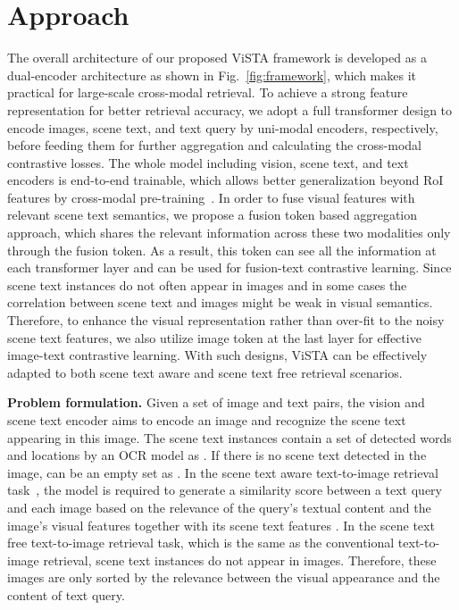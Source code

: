 \documentclass[10pt,twocolumn,letterpaper]{article}
\begin{document}
\section{Approach}
The overall architecture of our proposed ViSTA framework is developed as a dual-encoder architecture as shown in Fig.~\ref{fig:framework}, which makes it practical for large-scale cross-modal retrieval. To achieve a strong feature representation for better retrieval accuracy, we adopt a full transformer design to encode images, scene text, and text query by uni-modal encoders, respectively, before feeding them for further aggregation and calculating the cross-modal contrastive losses. The whole model including vision, scene text, and text encoders is end-to-end trainable, which allows better generalization beyond RoI features by cross-modal pre-training~\cite{Pixel-BERT}\cite{SOHO}\cite{ViLT}\cite{xue2021probing}. In order to fuse visual features with relevant scene text semantics, we propose a fusion token based aggregation approach, which shares the relevant information across these two modalities only through the fusion token. As a result, this token can see all the information at each transformer layer and can be used for fusion-text contrastive learning. Since scene text instances do not often appear in images and in some cases the correlation between scene text and images might be weak in visual semantics. Therefore, to enhance the visual representation rather than over-fit to the noisy scene text features, we also utilize image token at the last layer for effective image-text contrastive learning. With such designs, ViSTA can be effectively adapted to both scene text aware and scene text free retrieval scenarios.
 

\noindent \textbf{Problem formulation.} Given a set of image and text pairs, the vision and scene text encoder aims to encode an image  and recognize the scene text appearing in this image. The scene text instances contain a set of  detected words and locations by an OCR model as . If there is no scene text detected in the image,  can be an empty set as . In the scene text aware text-to-image retrieval task~\cite{STARNet}, the model is required to generate a similarity score   between a text query  and each image  based on the relevance of the query's textual content and the image's visual features  together with its scene text features . In the scene text free text-to-image retrieval task, which is the same as the conventional text-to-image retrieval, scene text instances do not appear in images. Therefore, these images are only sorted by the relevance between the visual appearance and the content of text query.
\end{document}
